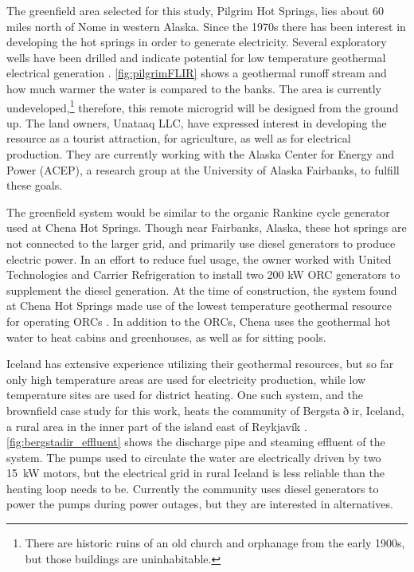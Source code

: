 The greenfield area selected for this study, Pilgrim Hot Springs, lies about 60 miles north of Nome in western Alaska. Since the 1970s there has been interest in developing the hot springs in order to generate electricity.  Several exploratory wells have been drilled and indicate potential for low temperature geothermal electrical generation \cite{Holdmann2013}. \autoref{fig:pilgrimFLIR} shows a geothermal runoff stream and how much warmer the water is compared to the banks. The area is currently undeveloped,\footnote{There are historic ruins of an old church and orphanage from the early 1900s, but those buildings are uninhabitable.} therefore, this remote microgrid will be designed from the ground up. The land owners, Unataaq LLC, have expressed interest in developing the resource as a tourist attraction, for agriculture, as well as for electrical production. They are currently working with the Alaska Center for Energy and Power (ACEP), a research group at the University of Alaska Fairbanks, to fulfill these goals. 


The greenfield system would be similar to the organic Rankine cycle generator used at Chena Hot Springs. Though near Fairbanks, Alaska, these hot springs are not connected to the larger grid, and primarily use diesel generators to produce electric power. In an effort to reduce fuel usage, the owner worked with United Technologies and Carrier Refrigeration to install two 200 kW ORC generators to supplement the diesel generation. At the time of construction, the system found at Chena Hot Springs made use of the lowest temperature geothermal resource for operating ORCs \cite{Holdmann2007}. In addition to the ORCs, Chena uses the geothermal hot water to heat cabins and greenhouses, as well as for sitting pools. 

Iceland has extensive experience utilizing their geothermal resources, but so far only high temperature areas are used for electricity production, while low temperature sites are used for district heating. One such system, and the brownfield case study for this work, heats the community of Bergsta$\eth$ir, Iceland, a rural area in the inner part of the island east of Reykjav\'ik . \autoref{fig:bergstadir_effluent} shows the discharge pipe and steaming effluent of the system. The pumps used to circulate the water are electrically driven by two \SI{15}{\kilo\watt} motors, but the electrical grid in rural Iceland is less reliable than the heating loop needs to be. Currently the community uses diesel generators to power the pumps during power outages, but they are interested in alternatives.


